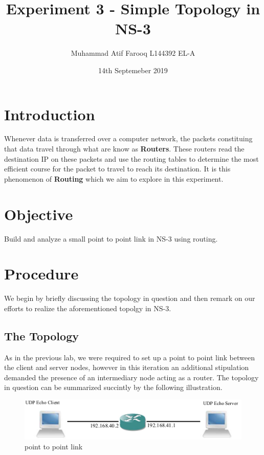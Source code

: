 \documentclass[fullpage]{article}
\begin{document}
   \title{Experiment 3 - Simple Topology in NS-3}

   \author{Muhammad Atif Farooq L144392 EL-A}

   \date{14th Septemeber 2019}

   \maketitle

\section{Introduction}
Whenever data is transferred over a computer network, the packets constituing that
data travel through what are know as \textbf{Routers}. These routers read the
destination IP on these packets and use the routing tables to determine the most
efficient course for the packet to travel to reach its destination. It is this
phenomenon of \textbf{Routing} which we aim to explore in this experiment.

\section{Objective}
Build and analyze a small point to point link in NS-3 using routing.

\section{Procedure}
We begin by briefly discussing the topology in question and then remark on our efforts to
realize the aforementioned topolgy in NS-3.

\subsection{The Topology}
As in the previous lab, we were required to set up a point to point link between the
client and server nodes, however in this iteration an additional stipulation demanded
the presence of an intermediary node acting as a router. The topology in question can be
summarized succintly by the following illustration.

\begin{figure}[H]
  \includegraphics[width=\linewidth]{topologyLabQuestion.png}
  \caption{point to point link}
  \label{fig:output2}
\end{figure}
\end{document}
